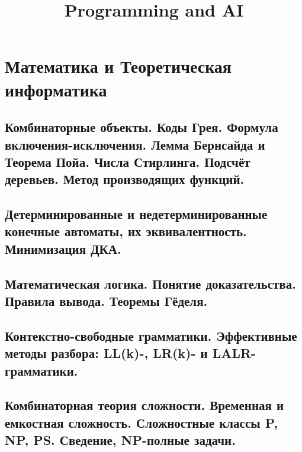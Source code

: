 \documentclass{article}
\title{Programming and AI} %
\begin{document}
	
\maketitle %
\tableofcontents
\section{Математика и Теоретическая информатика}























\subsection{Комбинаторные объекты. Коды Грея. Формула включения-исключения. Лемма Бернсайда и Теорема Пойа. Числа Стирлинга. Подсчёт деревьев. Метод производящих функций.}

\subsection{Детерминированные и недетерминированные конечные автоматы, их эквивалентность. Минимизация ДКА.}

\subsection{Математическая логика. Понятие доказательства. Правила вывода. Теоремы Гёделя.}

\subsection{Контекстно-свободные грамматики. Эффективные методы разбора: LL(k)-, LR(k)- и LALR-грамматики.}

\subsection{Комбинаторная теория сложности. Временная и емкостная сложность. Сложностные классы P, NP, PS. Сведение, NP-полные задачи.}
\end{document}
